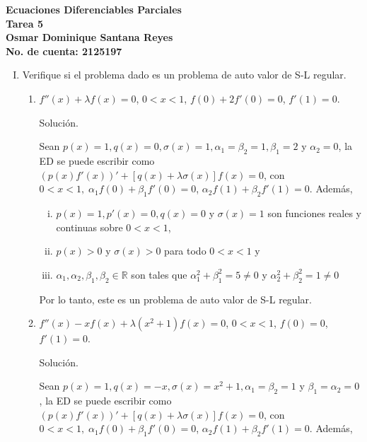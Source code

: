 \documentclass[fleqn]{article}
\newcommand{\real}{\mathbb{R}}
\begin{document}
	\bfseries
	Ecuaciones Diferenciables Parciales \\
	Tarea 5 \\
	Osmar Dominique Santana Reyes \\
	No. de cuenta: 2125197 \\

	\begin{enumerate}[I.]
		\item Verifique si el problema dado es un problema de auto valor de S-L regular.
		
		\begin{enumerate}
			\item $ f''(x) + \lambda f(x) = 0 $, $ 0 < x < 1 $, $ f(0) + 2 f'(0) = 0 $, $ f'(1) = 0 $.
			
			Solución.
			
			\normalfont

			Sean $ p(x) = 1, q(x) = 0, \sigma(x) = 1, \alpha_1 = \beta_2 = 1, \beta_1 = 2 $ y $ \alpha_2 = 0 $, la ED se puede escribir como $ \left( p(x) f'(x) \right)' + \left[ q(x) + \lambda \sigma(x) \right] f(x) = 0 $, con $ 0 < x < 1, \; \alpha_1 f(0) + \beta_1 f'(0) = 0 $, $ \alpha_2 f(1) + \beta_2 f'(1) = 0 $. Además,

			\begin{enumerate}[i)]
				\item $ p(x) = 1, p'(x) = 0, q(x) = 0 $ y $ \sigma(x) = 1 $ son funciones reales y continuas sobre $ 0 < x < 1 $,
				\item $ p(x) > 0 $ y $ \sigma(x) > 0 $ para todo $ 0 < x < 1 $ y
				\item $ \alpha_1, \alpha_2, \beta_1, \beta_2 \in \real $ son tales que $ \alpha_1^2 + \beta_1^2 = 5 \neq 0 $ y $ \alpha_2^2 + \beta_2^2 = 1 \neq 0 $
			\end{enumerate}

			Por lo tanto, este es un problema de auto valor de S-L regular. \vspace{3mm}

			\bfseries


			\item $ f''(x) - x f(x) + \lambda (x^2 + 1) f(x) = 0 $, $ 0 < x < 1 $, $ f(0) = 0 $, $ f'(1) = 0 $.
			
			Solución.
			
			\normalfont

			Sean $ p(x) = 1, q(x) = -x, \sigma(x) = x^2 + 1, \alpha_1 = \beta_2 = 1 $ y $ \beta_1 = \alpha_2 = 0 $, la ED se puede escribir como $ \left( p(x) f'(x) \right)' + \left[ q(x) + \lambda \sigma(x) \right] f(x) = 0 $, con $ 0 < x < 1, \; \alpha_1 f(0) + \beta_1 f'(0) = 0 $, $ \alpha_2 f(1) + \beta_2 f'(1) = 0 $. Además,


\end{enumerate}
\end{enumerate}
\end{document}
